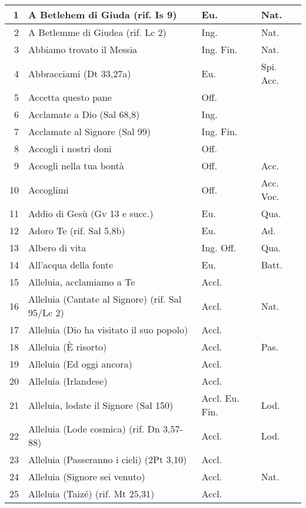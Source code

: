 \scriptsize{
\begin{center}
  \begin{longtable}{ | r | m{4.7cm} | m{1.8cm} | m{2cm}  |}
    \hline
    1 & A Betlehem di Giuda (rif. Is 9) & Eu. & Nat.\\ \hline
    2 & A Betlemme di Giudea (rif. Lc 2) & Ing. & Nat.\\ \hline
    3 & Abbiamo trovato il Messia & Ing. Fin. & Nat.\\ \hline
    4 & Abbracciami (Dt 33,27a) & Eu. & Spi. Acc.\\ \hline
    5 & Accetta questo pane & Off. & \\ \hline
    6 & Acclamate a Dio (Sal 68,8) & Ing. & \\ \hline
    7 & Acclamate al Signore (Sal 99) & Ing. Fin. & \\ \hline
    8 & Accogli i nostri doni & Off. & \\ \hline
    9 & Accogli nella tua bontà & Off. & Acc.\\ \hline
    10 & Accoglimi & Off. & Acc. Voc.\\ \hline
    11 & Addio di Gesù (Gv 13 e succ.) & Eu. & Qua.\\ \hline
    12 & Adoro Te (rif. Sal 5,8b) & Eu. & Ad.\\ \hline
    13 & Albero di vita & Ing. Off. & Qua.\\ \hline
    14 & All'acqua della fonte & Eu. & Batt.\\ \hline
    15 & Alleluia, acclamiamo a Te & Accl. & \\ \hline
    16 & Alleluia (Cantate al Signore) (rif. Sal 95/Lc 2) & Accl. & Nat.\\ \hline
    17 & Alleluia (Dio ha visitato il suo popolo) & Accl. & \\ \hline
    18 & Alleluia (È risorto) & Accl. & Pas.\\ \hline
    19 & Alleluia (Ed oggi ancora) & Accl. & \\ \hline
    20 & Alleluia (Irlandese) & Accl. & \\ \hline
    21 & Alleluia, lodate il Signore (Sal 150) & Accl. Eu. Fin. & Lod.\\ \hline
    22 & Alleluia (Lode cosmica) (rif. Dn 3,57-88) & Accl. & Lod.\\ \hline
    23 & Alleluia (Passeranno i cieli) (2Pt 3,10) & Accl. & \\ \hline
    24 & Alleluia (Signore sei venuto) & Accl. & Nat.\\ \hline
    25 & Alleluia (Taizé) (rif. Mt 25,31) & Accl. & \\ \hline

\end{longtable}
\end{center}}
